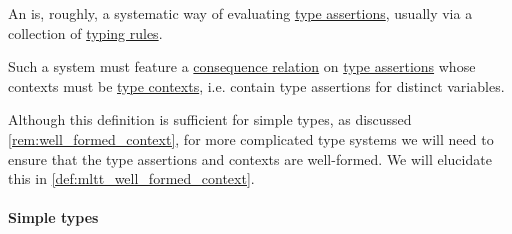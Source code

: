 \begin{definition}\label{def:abstract_type_system}\mimprovised
  An  is, roughly, a systematic way of evaluating \hyperref[def:type_assertion]{type assertions}, usually via a collection of \hyperref[con:typing_rule]{typing rules}.

  Such a system must feature a \hyperref[def:consequence_relation]{consequence relation} on \hyperref[def:type_assertion]{type assertions} whose contexts must be \hyperref[def:type_context]{type contexts}, i.e. contain type assertions for distinct variables.
\end{definition}
\begin{comments}
  \item Although this definition is sufficient for simple types, as discussed \cref{rem:well_formed_context}, for more complicated type systems we will need to ensure that the type assertions and contexts are well-formed. We will elucidate this in \cref{def:mltt_well_formed_context}.
\end{comments}

\paragraph{Simple types}

